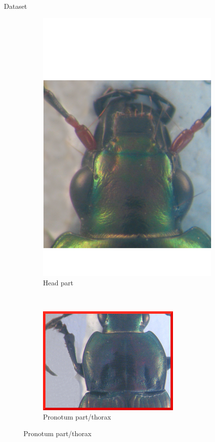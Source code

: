 \documentclass[10pt,svgnames]{beamer}
\begin{document}
\begin{frame}[c]{Dataset}
\begin{figure}[htbp]
\begin{subfigure}[t]{0.3\textwidth}
        			\centering
        			\includegraphics[scale=.2]{images/tete2}
        			\caption*{\footnotesize{Head part}}
        			\label{figsub22}
    			\end{subfigure}
    			~ 
    			\begin{subfigure}[t]{0.33\textwidth}
        			\centering
        			\includegraphics[scale=1.1]{images/pronotum}
        			\caption*{\footnotesize{Pronotum part/thorax}}
        			\label{figsub22}
    			\end{subfigure}
			\end{figure}
\end{frame}
\end{document}
